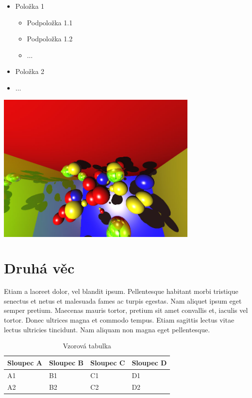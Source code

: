 \documentclass[12pt,a4paper,titlepage,final]{report}
\begin{document}
\begin{itemize}
	\item Položka 1
	\begin{itemize}
		\item Podpoložka 1.1
		\item Podpoložka 1.2
		\item $\ldots$
	\end{itemize}
	\item Položka 2
	\item $\ldots$
\end{itemize}

\begin{center}
	\captionsetup{type=figure}
		\includegraphics[width=10cm]{images/sample.jpg}
\end{center}

\section{Druhá věc}

Etiam a laoreet dolor, vel blandit ipsum. Pellentesque habitant morbi tristique senectus et netus et malesuada fames ac turpis egestas. Nam aliquet ipsum eget semper pretium. Maecenas mauris tortor, pretium sit amet convallis et, iaculis vel tortor. Donec ultrices magna et commodo tempus. Etiam sagittis lectus vitae lectus ultricies tincidunt. Nam aliquam non magna eget pellentesque.

\begin{table}[h!]
	\begin{center}
    \begin{tabular}{ | p{3.5cm} | p{3.5cm} | p{3.5cm} | p{3.5cm} |}
    \hline
    Sloupec A & Sloupec B & Sloupec C & Sloupec D
    \\ \hline

	A1 & B1 & C1 & D1
	\\ \hline

	A2 & B2 & C2 & D2
	\\ \hline

    \end{tabular}
	\end{center}
	\caption{Vzorová tabulka}
\end{table}
\end{document}
